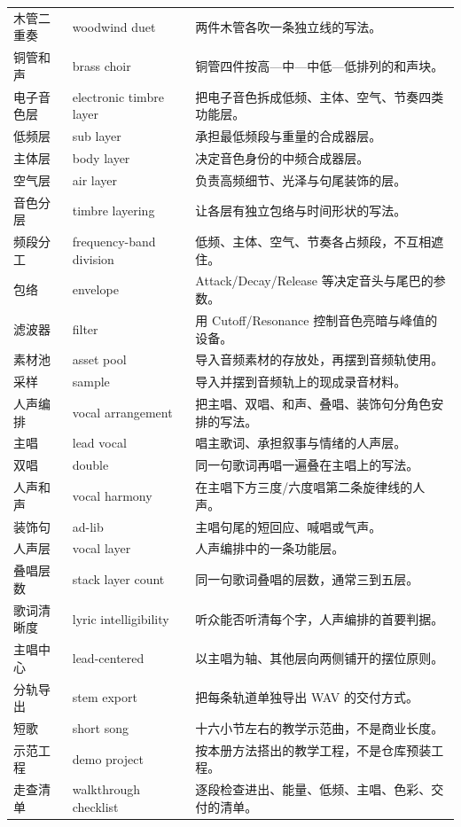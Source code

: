 \begin{longtable}{p{}p{}p{}}
木管二重奏 & woodwind duet & 两件木管各吹一条独立线的写法。 \\
铜管和声 & brass choir & 铜管四件按高—中—中低—低排列的和声块。 \\
电子音色层 & electronic timbre layer & 把电子音色拆成低频、主体、空气、节奏四类功能层。 \\
低频层 & sub layer & 承担最低频段与重量的合成器层。 \\
主体层 & body layer & 决定音色身份的中频合成器层。 \\
空气层 & air layer & 负责高频细节、光泽与句尾装饰的层。 \\
音色分层 & timbre layering & 让各层有独立包络与时间形状的写法。 \\
频段分工 & frequency-band division & 低频、主体、空气、节奏各占频段，不互相遮住。 \\
包络 & envelope & Attack/Decay/Release 等决定音头与尾巴的参数。 \\
滤波器 & filter & 用 Cutoff/Resonance 控制音色亮暗与峰值的设备。 \\
素材池 & asset pool & 导入音频素材的存放处，再摆到音频轨使用。 \\
采样 & sample & 导入并摆到音频轨上的现成录音材料。 \\
人声编排 & vocal arrangement & 把主唱、双唱、和声、叠唱、装饰句分角色安排的写法。 \\
主唱 & lead vocal & 唱主歌词、承担叙事与情绪的人声层。 \\
双唱 & double & 同一句歌词再唱一遍叠在主唱上的写法。 \\
人声和声 & vocal harmony & 在主唱下方三度/六度唱第二条旋律线的人声。 \\
装饰句 & ad-lib & 主唱句尾的短回应、喊唱或气声。 \\
人声层 & vocal layer & 人声编排中的一条功能层。 \\
叠唱层数 & stack layer count & 同一句歌词叠唱的层数，通常三到五层。 \\
歌词清晰度 & lyric intelligibility & 听众能否听清每个字，人声编排的首要判据。 \\
主唱中心 & lead-centered & 以主唱为轴、其他层向两侧铺开的摆位原则。 \\
分轨导出 & stem export & 把每条轨道单独导出 WAV 的交付方式。 \\
短歌 & short song & 十六小节左右的教学示范曲，不是商业长度。 \\
示范工程 & demo project & 按本册方法搭出的教学工程，不是仓库预装工程。 \\
走查清单 & walkthrough checklist & 逐段检查进出、能量、低频、主唱、色彩、交付的清单。 \\

\end{longtable}
